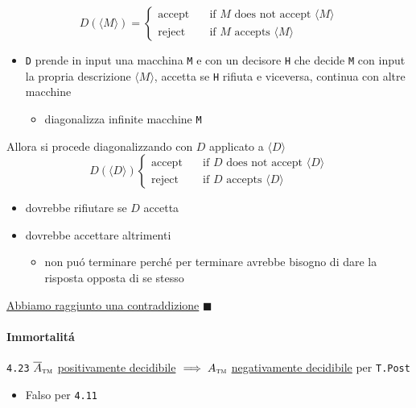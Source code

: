 \documentclass[
                        12pt, %
                        a4paper, %
                        oneside, %
                        headinclude,footinclude, %
                        BCOR5mm, %
                  ]{scrartcl}
\begin{document}
\[D(\langle M \rangle) = \begin{cases}
\text{accept} \quad &\text{if }M\text{ does not accept } \langle M \rangle \\
\text{reject} \quad &\text{if }M\text{ accepts } \langle M \rangle
\end{cases}\]

\begin{itemize}
\item \texttt{D} prende in input una macchina \texttt{M} e con un decisore \texttt{H} che decide \texttt{M} con input la propria descrizione \(\langle M \rangle\), accetta se \texttt{H} rifiuta e viceversa, continua con altre macchine
\begin{itemize}
\item diagonalizza infinite macchine \texttt{M}
\end{itemize}
\end{itemize}

Allora si procede diagonalizzando con \(D\) applicato a \(\langle D\rangle\)
\[D(\langle D \rangle)\begin{cases}
\text{accept} \quad &\text{if }D\text{ does not accept }\langle D \rangle \\
\text{reject} \quad &\text{if }D\text{ accepts }\langle D \rangle
\end{cases}\]
\begin{itemize}
\item dovrebbe rifiutare se \(D\) accetta
\item dovrebbe accettare altrimenti
\begin{itemize}
\item non puó terminare perché per terminare avrebbe bisogno di dare la risposta opposta di se stesso
\end{itemize}
\end{itemize}
\uline{Abbiamo raggiunto una contraddizione}                                                             \(\blacksquare\)

\paragraph{Immortalitá}
\label{sec:org02cc6a9}
\texttt{4.23}
\(\overline A_{\textsc{tm}}\) \uline{positivamente decidibile} \(\implies  A_{\textsc{tm}}\) \uline{negativamente decidibile} per \texttt{T.Post}
\begin{itemize}
\item Falso per \texttt{4.11}
\end{itemize}
\end{document}
